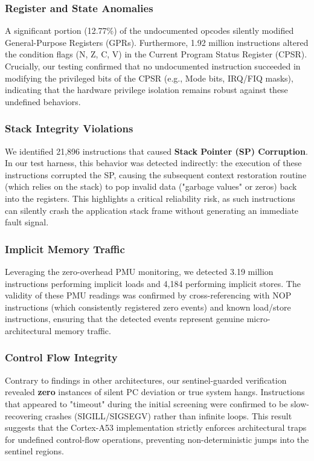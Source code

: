 \documentclass[pdflatex,sn-mathphys]{sn-jnl}%
\theoremstyle{thmstyleone}%
\theoremstyle{thmstyletwo}%
\theoremstyle{thmstylethree}%
\begin{document}
\subsubsection{Register and State Anomalies}
A significant portion (12.77\%) of the undocumented opcodes silently modified General-Purpose Registers (GPRs). Furthermore, 1.92 million instructions altered the condition flags (N, Z, C, V) in the Current Program Status Register (CPSR). Crucially, our testing confirmed that no undocumented instruction succeeded in modifying the privileged bits of the CPSR (e.g., Mode bits, IRQ/FIQ masks), indicating that the hardware privilege isolation remains robust against these undefined behaviors.

\subsubsection{Stack Integrity Violations}
We identified 21,896 instructions that caused \textbf{Stack Pointer (SP) Corruption}. In our test harness, this behavior was detected indirectly: the execution of these instructions corrupted the SP, causing the subsequent context restoration routine (which relies on the stack) to pop invalid data ("garbage values" or zeros) back into the registers. This highlights a critical reliability risk, as such instructions can silently crash the application stack frame without generating an immediate fault signal.

\subsubsection{Implicit Memory Traffic}
Leveraging the zero-overhead PMU monitoring, we detected 3.19 million instructions performing implicit loads and 4,184 performing implicit stores. The validity of these PMU readings was confirmed by cross-referencing with NOP instructions (which consistently registered zero events) and known load/store instructions, ensuring that the detected events represent genuine micro-architectural memory traffic.

\subsubsection{Control Flow Integrity}
Contrary to findings in other architectures, our sentinel-guarded verification revealed \textbf{zero} instances of silent PC deviation or true system hangs. Instructions that appeared to "timeout" during the initial screening were confirmed to be slow-recovering crashes (SIGILL/SIGSEGV) rather than infinite loops. This result suggests that the Cortex-A53 implementation strictly enforces architectural traps for undefined control-flow operations, preventing non-deterministic jumps into the sentinel regions.
\end{document}
